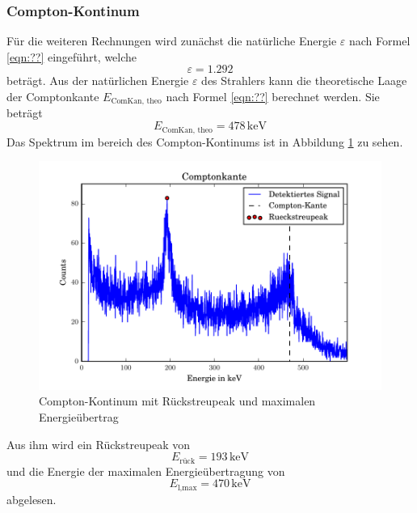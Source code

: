 \subsubsection{Compton-Kontinum}
Für die weiteren Rechnungen wird zunächst die natürliche Energie $\varepsilon$ nach Formel \ref{eqn:??} eingeführt, welche 
\begin{equation}
  \varepsilon = 1.292 
  \label{eqn:nE}
\end{equation}
beträgt. Aus der natürlichen Energie $\varepsilon$ des Strahlers kann die theoretische Laage der Comptonkante $E_\text{ComKan, theo}$ nach Formel \ref{eqn:??} berechnet werden. Sie beträgt
\begin{equation}
  E_\text{ComKan, theo} = 478 \, \text{keV}
  \label{eqn:KanTheo}
\end{equation} 
Das Spektrum im bereich des Compton-Kontinums ist in Abbildung \ref{fig:Compt} zu sehen.
\begin{figure}[htpb]
  \centering
  \includegraphics[width=\textwidth]{./build/Compton.pdf}
  \caption{Compton-Kontinum mit Rückstreupeak und maximalen Energieübertrag}
  \label{fig:Compt}
\end{figure}
Aus ihm wird ein Rückstreupeak von 
\begin{equation}
  E_\text{rück} = 193 \, \text{keV}
  \label{eqn:KanExp}
\end{equation}
und die Energie der maximalen Energieübertragung von 
\begin{equation}
  E_\text{l,max} = 470 \, \text{keV}
  \label{eqn:RückExp}
\end{equation} 
abgelesen. 
